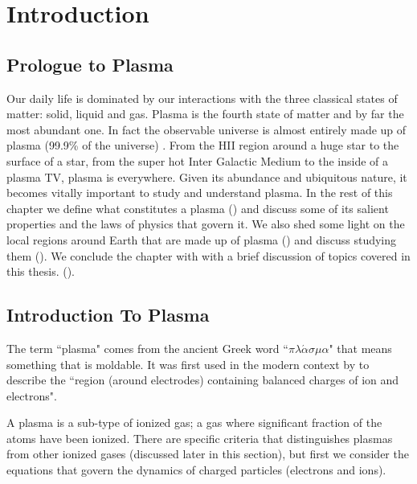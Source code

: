 %
%
\chapter{Introduction}\label{chap:chap1}

    \section{Prologue to Plasma}\label{sec:plas0}

        Our daily life is dominated by our interactions with the three classical states of matter:
        solid, liquid and gas. Plasma is the fourth state of matter and by far the most abundant
        one. In fact the observable universe is almost entirely made up of plasma (99.9\% of the
        universe) \citep{Boulos1994}. From the HII region around a huge star to the surface of a
        star, from the super hot Inter Galactic Medium to the inside of a plasma TV, plasma is
        everywhere. Given its abundance and ubiquitous nature, it becomes vitally important to study
        and understand plasma. In the rest of this chapter we define what constitutes a plasma
        () and  discuss some of its salient properties and the laws of physics that
        govern it. We also shed some light on the local regions around Earth that are made up of
        plasma () and discuss studying them (). We conclude the
        chapter with with a brief discussion of topics covered in this thesis. ().

    \section{Introduction To Plasma} \label{sec:plas1}

        The term ``plasma" comes from the ancient Greek word ``$\pi \lambda \acute{\alpha} \sigma
        \mu \alpha$" that means something that is moldable. It was first used in the modern context
        by \citet{Langmuir1928} to describe the ``region (around electrodes) containing balanced
        charges of ion and electrons".
        
        A plasma is a sub-type of ionized gas; a gas where significant fraction of the atoms have
        been ionized. There are specific criteria that distinguishes plasmas from other ionized
        gases (discussed later in this section), but first we consider the equations that govern the
        dynamics of charged particles (electrons and ions).

